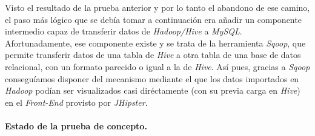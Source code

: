 \par
Visto el resultado de la prueba anterior y por lo tanto el abandono de ese camino, el paso más lógico que se debía tomar a continuación era añadir un componente intermedio capaz de transferir datos de \textit{Hadoop/Hive} a \textit{MySQL}. Afortunadamente, ese componente existe y se trata de la herramienta \textit{Sqoop}, que permite transferir datos de una tabla de \textit{Hive} a otra tabla de una base de datos relacional, con un formato parecido o igual a la de \textit{Hive}. Así pues, gracias a \textit{Sqoop} conseguíamos disponer del mecanismo mediante el que los datos importados en \textit{Hadoop} podían ser visualizados casi diréctamente (con su previa carga en \textit{Hive}) en el \textit{Front-End} provisto por \textit{JHipster}. 


\bigskip
\par
\paragraph*{Estado de la prueba de concepto.}

